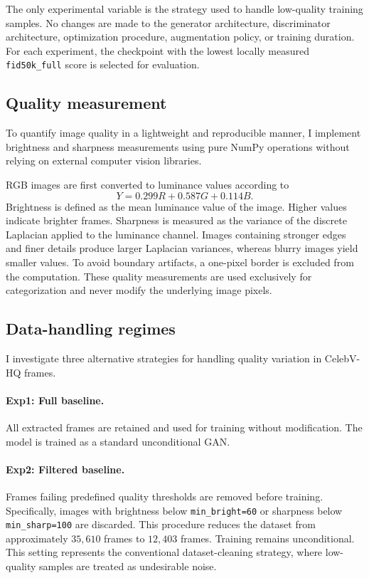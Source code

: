\documentclass{article}
\begin{document}
The only experimental variable is the strategy used to handle low-quality training samples. No changes are made to the generator architecture, discriminator architecture, optimization procedure, augmentation policy, or training duration. For each experiment, the checkpoint with the lowest locally measured \texttt{fid50k\_full} score is selected for evaluation.

\subsection{Quality measurement}
To quantify image quality in a lightweight and reproducible manner, I implement brightness and sharpness measurements using pure NumPy operations without relying on external computer vision libraries.

RGB images are first converted to luminance values according to
\[ Y = 0.299R + 0.587G + 0.114B. \]
Brightness is defined as the mean luminance value of the image. Higher values indicate brighter frames. Sharpness is measured as the variance of the discrete Laplacian applied to the luminance channel. Images containing stronger edges and finer details produce larger Laplacian variances, whereas blurry images yield smaller values. To avoid boundary artifacts, a one-pixel border is excluded from the computation. These quality measurements are used exclusively for categorization and never modify the underlying image pixels.

\subsection{Data-handling regimes}
I investigate three alternative strategies for handling quality variation in CelebV-HQ frames.

\paragraph{Exp1: Full baseline.}
All extracted frames are retained and used for training without modification. The model is trained as a standard unconditional GAN.

\paragraph{Exp2: Filtered baseline.}
Frames failing predefined quality thresholds are removed before training. Specifically, images with brightness below \texttt{min\_bright=60} or sharpness below \texttt{min\_sharp=100} are discarded. This procedure reduces the dataset from approximately $35,610$ frames to $12,403$ frames. Training remains unconditional. This setting represents the conventional dataset-cleaning strategy, where low-quality samples are treated as undesirable noise.
\end{document}
